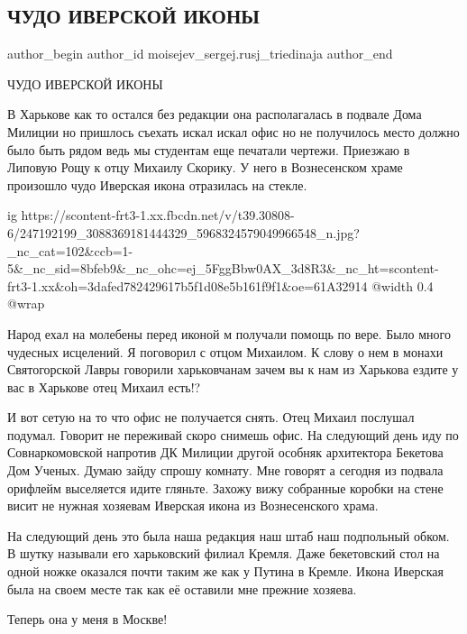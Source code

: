  
 
 
 
 
 
\subsection{ЧУДО ИВЕРСКОЙ ИКОНЫ}
\label{sec:26_10_2021.fb.moisejev_sergej.rusj_triedinaja.1.chudo_iverskoj_ikony}
 
\ifcmt
 author_begin
   author_id moisejev_sergej.rusj_triedinaja
 author_end
\fi

ЧУДО ИВЕРСКОЙ ИКОНЫ

В Харькове как то остался без редакции она располагалась в подвале Дома Милиции
но пришлось съехать искал искал офис но не получилось место должно было быть
рядом ведь мы студентам еще печатали чертежи. Приезжаю в Липовую Рощу к отцу
Михаилу Скорику.  У него в Вознесенском храме произошло чудо Иверская икона
отразилась на стекле. 

\ifcmt
  ig https://scontent-frt3-1.xx.fbcdn.net/v/t39.30808-6/247192199_3088369181444329_5968324579049966548_n.jpg?_nc_cat=102&ccb=1-5&_nc_sid=8bfeb9&_nc_ohc=ej_5FggBbw0AX_3d8R3&_nc_ht=scontent-frt3-1.xx&oh=3dafed782429617b5f1d08e5b161f9f1&oe=61A32914
  @width 0.4
  @wrap 
\fi

Народ ехал на молебены перед иконой м получали помощь по вере. Было много
чудесных исцелений. Я поговорил с отцом Михаилом. К слову о нем в монахи
Святогорской Лавры говорили харьковчанам зачем вы к нам из Харькова ездите у
вас в Харькове отец Михаил есть!?  

И вот сетую на то что офис не получается снять. Отец Михаил послушал подумал.
Говорит не переживай скоро снимешь офис.  На следующий день иду по
Совнаркомовской напротив ДК Милиции другой особняк архитектора Бекетова Дом
Ученых. Думаю зайду спрошу комнату. Мне говорят а сегодня из подвала орифлейм
выселяется идите гляньте. Захожу вижу собранные коробки на стене висит не
нужная хозяевам Иверская икона из Вознесенского храма. 

На следующий день это была наша редакция наш штаб наш подпольный обком. В шутку
называли его харьковский филиал Кремля. Даже бекетовский стол на одной ножке
оказался почти таким же как у Путина в Кремле.  Икона Иверская была на своем
месте так как её оставили мне прежние хозяева.  

Теперь она у меня в Москве!

